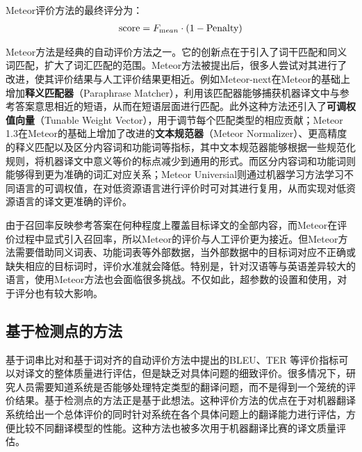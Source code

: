 \parinterval Meteor评价方法的最终评分为：
\begin{eqnarray}
\textrm {score} = { F_{\textrm mean}} \cdot {(1 - \textrm {Penalty})}
\label{eq:4-12}
\end{eqnarray}

\parinterval Meteor方法是经典的自动评价方法之一。它的创新点在于引入了词干匹配和同义词匹配，扩大了词汇匹配的范围。Meteor方法被提出后，很多人尝试对其进行了改进，使其评价结果与人工评价结果更相近。例如Meteor-next在Meteor的基础上增加{\small\sffamily\bfseries{释义匹配器}}（Paraphrase Matcher），利用该匹配器能够捕获机器译文中与参考答案意思相近的短语，从而在短语层面进行匹配。此外这种方法还引入了{\small\sffamily\bfseries{可调权值向量}}（Tunable Weight Vector），用于调节每个匹配类型的相应贡献；Meteor 1.3在Meteor的基础上增加了改进的{\small\sffamily\bfseries{文本规范器}}（Meteor Normalizer）、更高精度的释义匹配以及区分内容词和功能词等指标，其中文本规范器能够根据一些规范化规则，将机器译文中意义等价的标点减少到通用的形式。而区分内容词和功能词则能够得到更为准确的词汇对应关系；Meteor Universial则通过机器学习方法学习不同语言的可调权值，在对低资源语言进行评价时可对其进行复用，从而实现对低资源语言的译文更准确的评价。

\parinterval 由于召回率反映参考答案在何种程度上覆盖目标译文的全部内容，而Meteor在评价过程中显式引入召回率，所以Meteor的评价与人工评价更为接近。但Meteor方法需要借助同义词表、功能词表等外部数据，当外部数据中的目标词对应不正确或缺失相应的目标词时，评价水准就会降低。特别是，针对汉语等与英语差异较大的语言，使用Meteor方法也会面临很多挑战。不仅如此，超参数的设置和使用，对于评分也有较大影响。


\subsection{基于检测点的方法}

\parinterval 基于词串比对和基于词对齐的自动评价方法中提出的BLEU、TER 等评价指标可以对译文的整体质量进行评估，但是缺乏对具体问题的细致评价。很多情况下，研究人员需要知道系统是否能够处理特定类型的翻译问题，而不是得到一个笼统的评价结果。基于检测点的方法正是基于此想法。这种评价方法的优点在于对机器翻译系统给出一个总体评价的同时针对系统在各个具体问题上的翻译能力进行评估，方便比较不同翻译模型的性能。这种方法也被多次用于机器翻译比赛的译文质量评估。

